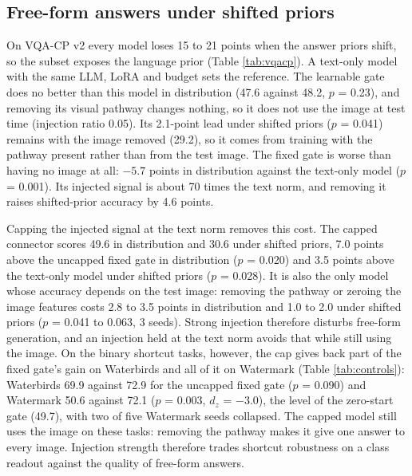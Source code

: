 \subsection{Free-form answers under shifted priors}

On VQA-CP v2 every model loses 15 to 21 points when the answer priors shift, so the subset exposes the language
prior (Table \ref{tab:vqacp}). A text-only model with the same LLM, LoRA and budget sets the reference. The learnable gate does no
better than this model in distribution (47.6 against 48.2, \(p\) = 0.23), and removing its visual pathway changes
nothing, so it does not use the image at test time (injection ratio 0.05). Its 2.1-point lead under shifted priors
(\(p\) = 0.041) remains with the image removed (29.2), so it comes from training with the pathway present rather
than from the test image. The fixed gate is worse than having no image at all: \(-5.7\) points in distribution
against the text-only model (\(p\) = 0.001). Its injected signal is about 70 times the text norm, and removing it
raises shifted-prior accuracy by 4.6 points.

Capping the injected signal at the text norm removes this cost. The capped connector scores 49.6 in distribution and
30.6 under shifted priors, 7.0 points above the uncapped fixed gate in distribution (\(p\) = 0.020) and 3.5 points
above the text-only model under shifted priors (\(p\) = 0.028). It is also the only model whose accuracy depends on
the test image: removing the pathway or zeroing the image features costs 2.8
to 3.5 points in distribution and 1.0 to 2.0 under shifted priors (\(p\) = 0.041 to 0.063, 3 seeds). Strong injection
therefore disturbs free-form generation, and an injection held at the text norm avoids that while still using the
image. On the binary shortcut tasks, however, the cap gives back part of the fixed gate's gain on Waterbirds and all of it on Watermark (Table \ref{tab:controls}):
Waterbirds 69.9 against 72.9 for the uncapped fixed gate (\(p\) = 0.090) and Watermark 50.6 against 72.1 (\(p\) = 0.003,
\(d_z\) = \(-3.0\)), the level of the zero-start gate (49.7), with two of five Watermark seeds collapsed. The capped model still uses the image on these tasks: removing
the pathway makes it give one answer to every image. Injection strength therefore trades shortcut robustness on a
class readout against the quality of free-form answers.

